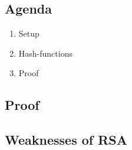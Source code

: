 

\subsection*{Agenda}
\begin{enumerate}
\item Setup
\item Hash-functions
\item Proof
\end{enumerate}



\subsection{Proof}


\subsection{Weaknesses of RSA}
